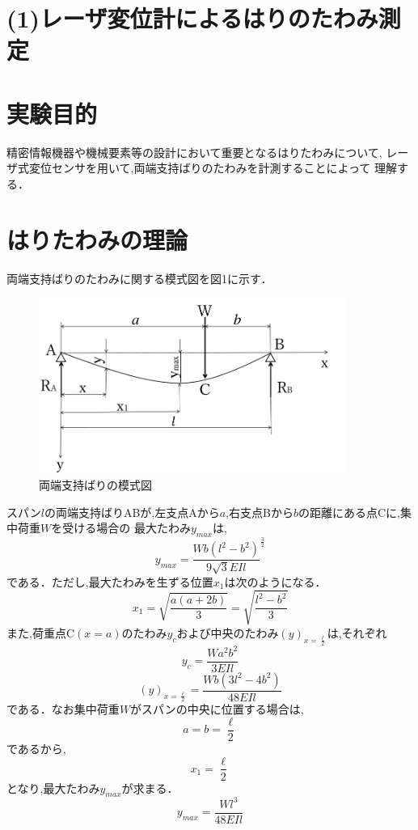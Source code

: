\documentclass[a4paper,12pt]{jsarticle}
\begin{document}
\section*{(1)レーザ変位計によるはりのたわみ測定}

\section{実験目的}
精密情報機器や機械要素等の設計において重要となるはりたわみについて,
レーザ式変位センサを用いて,両端支持ばりのたわみを計測することによって
理解する．

\section{はりたわみの理論}
両端支持ばりのたわみに関する模式図を図1に示す．

\begin{figure}[h]
  \centering
  \includegraphics[width=10cm]{AB.png}
  \caption{両端支持ばりの模式図}
\end{figure}
スパン$l$の両端支持ばりABが,左支点Aから$a$,右支点Bから$b$の距離にある点Cに,集中荷重$W$を受ける場合の
最大たわみ$y_{max}$は,
\begin{equation}
  y_{max} = {\dfrac{Wb({l^2}-{b^2})}{9\sqrt{3}EIl}}^{\frac{3}{2}}
\end{equation}
である．ただし,最大たわみを生ずる位置$x_1$は次のようになる．
\begin{equation}
  x_1 = {\sqrt{\dfrac{a(a+2b)}{3}}}={\sqrt{\dfrac{{l^2}-{b^2}}{3}}}
\end{equation}
また,荷重点C$(x=a)$のたわみ$y_c$および中央のたわみ$(y)_{x=\frac{\ell}{2}}$は,それぞれ
\begin{equation}
  y_{c} = {\dfrac{Wa^{2}b^{2}}{3EIl}}
\end{equation}
\begin{equation}
  (y)_{x=\frac{\ell}{2}} = {\dfrac{Wb(3l^{2}-4b^{2})}{48EIl}}
\end{equation}
である．なお集中荷重$W$がスパンの中央に位置する場合は,
\begin{equation}
  a = b = \dfrac{\ell}{2}
\end{equation}
であるから,
\begin{equation}
  x_1 = \dfrac{\ell}{2}
\end{equation}
となり,最大たわみ$y_{max}$が求まる．
\begin{equation}
  y_{max} = {\dfrac{Wl^{3}}{48EIl}}
\end{equation}
\end{document}
